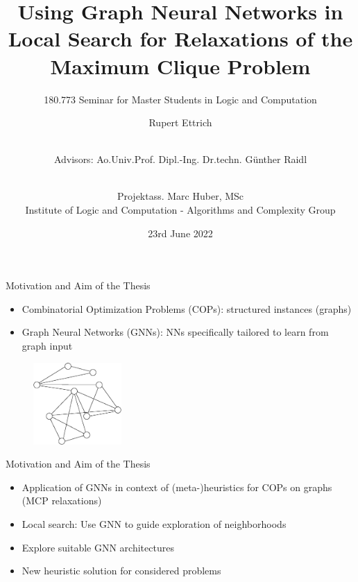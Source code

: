 \documentclass{beamer}
\title{Using Graph Neural Networks in Local Search for Relaxations of the Maximum Clique Problem}
\subtitle{180.773 Seminar for Master Students in Logic and Computation}
\author{Rupert Ettrich \and \\ \scriptsize Advisors:  Ao.Univ.Prof. Dipl.-Ing. Dr.techn. Günther Raidl \and \\ Projektass. Marc Huber, MSc \\ Institute of Logic and Computation - Algorithms and Complexity Group}
\date{23rd June 2022}
\begin{document}
\maketitle

    

\begin{frame}{Motivation and Aim of the Thesis}
    \begin{itemize}
        \item<1-> Combinatorial Optimization Problems (COPs): structured instances (graphs)
        \item<2-> Graph Neural Networks (GNNs): NNs specifically tailored to learn from graph input 
    \end{itemize}
\begin{figure}
    \centering
    \includegraphics[width=0.3\textwidth]{graphics/graph1.eps}
\end{figure}
\end{frame}

\begin{frame}{Motivation and Aim of the Thesis}
    \begin{itemize}
        \item<1-> Application of GNNs in context of (meta-)heuristics for COPs on graphs (MCP relaxations)
        \item<2-> Local search: Use GNN to guide exploration of neighborhoods
        \item<3-> Explore suitable GNN architectures
        \item<4-> New heuristic solution for considered problems
    \end{itemize}
\end{frame}
\end{document}
